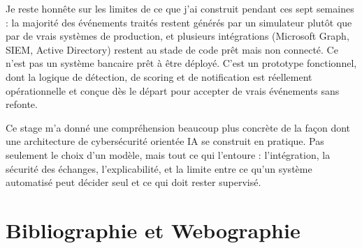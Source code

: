 \documentclass[12pt,a4paper]{report}
\begin{document}
Je reste honnête sur les limites de ce que j'ai construit pendant ces sept semaines : la majorité des événements traités restent générés par un simulateur plutôt que par de vrais systèmes de production, et plusieurs intégrations (Microsoft Graph, SIEM, Active Directory) restent au stade de code prêt mais non connecté. Ce n'est pas un système bancaire prêt à être déployé. C'est un prototype fonctionnel, dont la logique de détection, de scoring et de notification est réellement opérationnelle et conçue dès le départ pour accepter de vrais événements sans refonte.

Ce stage m'a donné une compréhension beaucoup plus concrète de la façon dont une architecture de cybersécurité orientée IA se construit en pratique. Pas seulement le choix d'un modèle, mais tout ce qui l'entoure : l'intégration, la sécurité des échanges, l'explicabilité, et la limite entre ce qu'un système automatisé peut décider seul et ce qui doit rester supervisé.

\chapter*{Bibliographie et Webographie}
\end{document}

